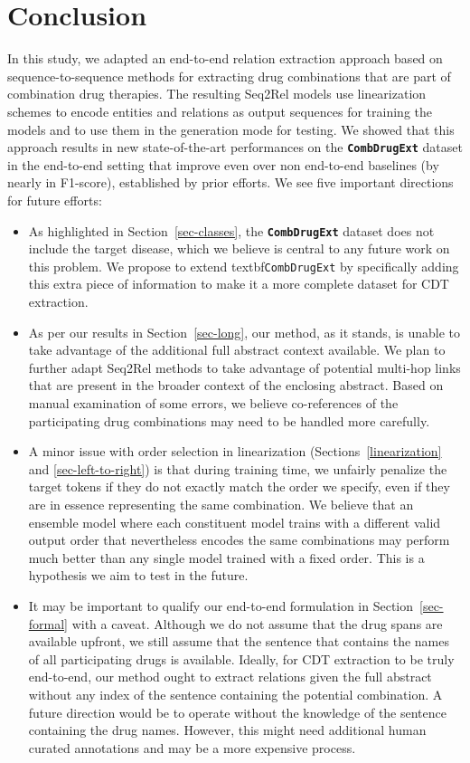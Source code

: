 \documentclass[conference]{IEEEtran}
\begin{document}
\section{Conclusion}
In this study, we adapted an end-to-end relation extraction approach  based on sequence-to-sequence methods for extracting drug combinations that are part of combination drug therapies. The resulting Seq2Rel models use linearization schemes to encode entities and relations as output sequences for training the models and to use them in the generation mode for testing. We showed that this approach results in new state-of-the-art performances on the \textbf{\texttt{CombDrugExt}} dataset in the end-to-end setting that improve even over non end-to-end baselines (by nearly  in F1-score), established by prior efforts. We see five important directions for future efforts:
\begin{itemize}
\item As highlighted in Section~\ref{sec-classes}, the \textbf{\texttt{CombDrugExt}} dataset does not include the target disease, which we believe is central to any future work on this problem. We propose to extend textbf{\texttt{CombDrugExt}}  by specifically adding this extra piece of information to make it a more complete dataset for CDT extraction. 

\item As per our results in Section~\ref{sec-long}, our method, as it stands, is unable to take advantage of the additional full abstract context available. We plan  to further adapt Seq2Rel methods to take advantage of potential multi-hop links that are present in the broader context of the enclosing abstract. Based on manual examination of some errors, we believe co-references of the participating drug combinations may need to be handled more carefully. 

\item A minor issue with order selection in linearization (Sections~\ref{linearization} and \ref{sec-left-to-right}) is that during training time, we unfairly penalize the target tokens if they do not exactly match the order we specify, even if they are in essence representing the same combination. We believe that an ensemble model where each constituent model trains with a   different valid output order that nevertheless encodes the same combinations may perform much better than any single model trained with a fixed order. This is a hypothesis we aim to test in the future. 

\item It may be important to qualify our end-to-end formulation in Section~\ref{sec-formal} with a caveat. Although we do not assume that the drug spans are available upfront, we still assume that the sentence that contains the names of all participating drugs is available. Ideally, for CDT  extraction to be truly end-to-end, our method ought to extract relations given the full abstract without any index of the sentence containing the potential combination. A future direction would be to operate without the knowledge of the sentence containing the drug names. However, this might need additional human curated annotations and may be a more expensive process. 



\end{itemize}
\end{document}
